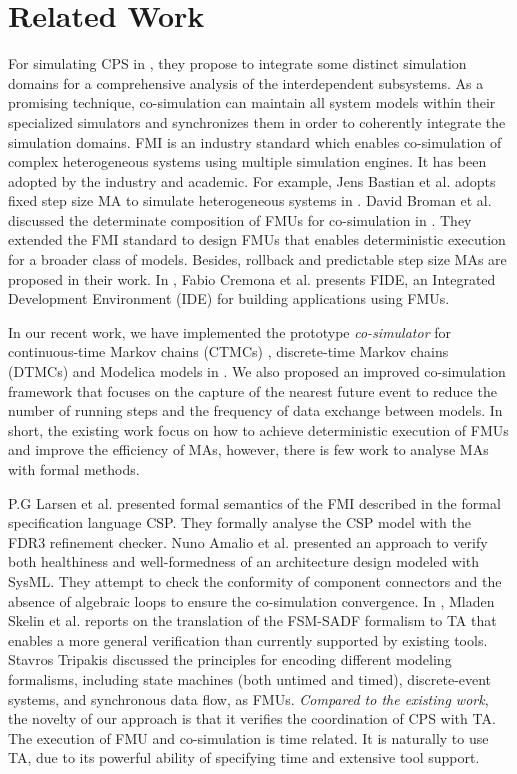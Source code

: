 \section{Related Work}
\label{sec:relateworks}
For simulating CPS in \cite{GeorgMRW14}, they propose to integrate some distinct simulation domains for a comprehensive analysis of the interdependent subsystems. As a promising technique, co-simulation \cite{Bogomolov2015Co} can maintain all system models within their specialized simulators and synchronizes them in order to coherently integrate the simulation domains. FMI \cite{Blochwitz2011The}\cite{FMI2INTRO} is an industry standard which enables co-simulation of complex heterogeneous systems using multiple simulation engines. It has been adopted by the industry and academic. For example, Jens Bastian et al. adopts fixed step size MA to simulate heterogeneous systems in \cite{Bastian2011Master}.
David Broman et al. discussed the determinate composition of FMUs for co-simulation in \cite{BromanBGLMTW13}. They extended the FMI standard to design FMUs that enables deterministic execution for a broader class of models. Besides, rollback and predictable step size MAs are proposed in their work. In \cite{CremonaLTBL16}, Fabio Cremona et al. presents FIDE, an Integrated Development Environment (IDE) for building applications using FMUs. 

In our recent work, we have implemented the prototype \textit{co-simulator} for continuous-time Markov chains (CTMCs) \cite{DanosHGS17}, discrete-time Markov chains (DTMCs) \cite{Guerry13} and Modelica models in \cite{LiuJWCD16}. We also proposed an improved co-simulation framework that focuses on the capture of the nearest future event to reduce the number of running steps and the frequency of data exchange between models. In short, the existing work focus on how to achieve deterministic execution of FMUs and improve the efficiency of MAs, however, there is few work to analyse MAs with formal methods.

P.G Larsen et al. \cite{Larsen2016Integrated} presented formal semantics of the FMI described in the formal specification language CSP. They formally analyse the CSP model with the FDR3 refinement checker. Nuno Amalio et al. \cite{AmalioPCW16} presented an approach to verify both healthiness and well-formedness of an architecture design modeled with SysML. They attempt to check the conformity of component connectors and the absence of algebraic loops to ensure the co-simulation convergence.
In \cite{SkelinWOHL15}, Mladen Skelin et al. reports on the translation of the FSM-SADF formalism to TA that enables a more general
verification than currently supported by existing tools. Stavros Tripakis \cite{Tripakis15} discussed the principles for encoding different modeling formalisms, including state machines (both untimed and timed), discrete-event systems, and synchronous data flow, as FMUs. 
\emph{Compared to the existing work}, the novelty of our approach is that it verifies the coordination of CPS with TA. The execution of FMU and co-simulation is time related. It is naturally to use TA, due to its powerful ability of specifying time and extensive tool support.


